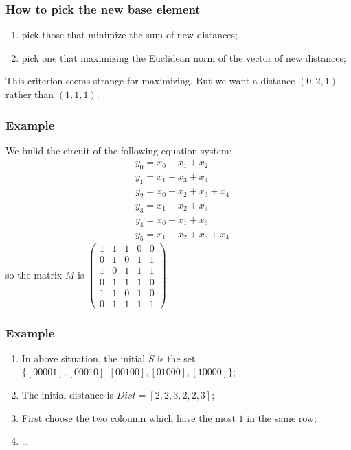 \documentclass[
    aspectratio=169,                   %
]{beamer}
\begin{document}
    \begin{frame}
        \frametitle{How to pick the new base element}
    
        \begin{enumerate}
            \item pick those that minimize the sum of new distances;
            \item pick one that maximizing the Euclidean norm of the vector of new distances;
        \end{enumerate}
        This criterion seems strange for maximizing. But we want a distance $ (0,2,1) $ rather than $ (1,1,1) $. 
    \end{frame}


    \begin{frame}
        \frametitle{Example}
        We  bulid the circuit of the following equation system:
        \[\begin{aligned}
            &y_{0}=x_{0}+x_{1}+x_{2} \\
            &y_{1}=x_{1}+x_{3}+x_{4} \\
            &y_{2}=x_{0}+x_{2}+x_{3}+x_{4} \\
            &y_{3}=x_{1}+x_{2}+x_{3} \\
            &y_{4}=x_{0}+x_{1}+x_{3} \\
            &y_{5}=x_{1}+x_{2}+x_{3}+x_{4}
        \end{aligned}\]
        so the matrix $ M $ is $\begin{pmatrix}
                1 & 1 & 1 & 0 & 0 \\
                0 & 1 & 0 & 1 & 1 \\
                1 & 0 & 1 & 1 & 1 \\
                0 & 1 & 1 & 1 & 0 \\
                1 & 1 & 0 & 1 & 0 \\
                0 & 1 & 1 & 1 & 1
            \end{pmatrix}.$
    \end{frame}

    \begin{frame}
        \frametitle{Example}
    
        \begin{enumerate}
            \item In above situation, the initial $ S $ is the set $ \{[0 0 0 0 1],[00010],[00100],[01000],[10000]\} $;
            \item The initial distance is $ Dist=[2,2,3,2,2,3] $;
            \item First choose the two coloumn which have the most $ 1 $ in the same row;
            \item \dots 
        \end{enumerate}

    \end{frame}

    

    \makebottom     %
\end{document}
